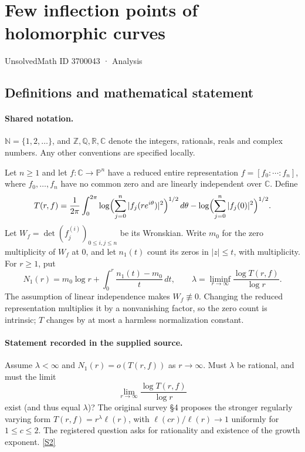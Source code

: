 \documentclass[11pt]{article}
\newcommand{\sref}[2]{\hyperlink{source:#1:#2}{[S#2]}}
\begin{document}
\setcounter{section}{3700042}
\section{Few inflection points of holomorphic curves}\label{3700043}
{\small\sffamily UnsolvedMath ID 3700043 · Analysis}
\subsection{Definitions and mathematical statement}

\paragraph{Shared notation.}$\mathbb N=\{1,2,\ldots\}$, and $\mathbb Z,\mathbb Q,\mathbb R,\mathbb C$ denote the integers, rationals, reals and complex numbers. Any other conventions are specified locally.


Let $n\ge1$ and let $f:\mathbb C\to\mathbb P^n$ have a reduced entire representation $f=[f_0:\cdots:f_n]$, where $f_0,\ldots,f_n$ have no common zero and are linearly independent over $\mathbb C$. Define
\[
 T(r,f)=\frac{1}{2\pi}\int_0^{2\pi}\log\Bigl(\sum_{j=0}^{n}|f_j(re^{i\theta})|^2\Bigr)^{1/2}\,d\theta
 -\log\Bigl(\sum_{j=0}^{n}|f_j(0)|^2\Bigr)^{1/2}.
\]
Let $W_f=\det(f_j^{(i)})_{0\le i,j\le n}$ be its Wronskian. Write $m_0$ for the zero multiplicity of $W_f$ at $0$, and let $n_1(t)$ count its zeros in $|z|\le t$, with multiplicity. For $r\ge1$, put
\[
 N_1(r)=m_0\log r+\int_0^r\frac{n_1(t)-m_0}{t}\,dt,
 \qquad\lambda=\liminf_{r\to\infty}\frac{\log T(r,f)}{\log r}.
\]
The assumption of linear independence makes $W_f\not\equiv0$. Changing the reduced representation multiplies it by a nonvanishing factor, so the zero count is intrinsic; $T$ changes by at most a harmless normalization constant.
\paragraph{Statement recorded in the supplied source.}
Assume $\lambda<\infty$ and $N_1(r)=o(T(r,f))$ as $r\to\infty$. Must $\lambda$ be rational, and must the limit
\[
 \lim_{r\to\infty}\frac{\log T(r,f)}{\log r}
\]
exist (and thus equal $\lambda$)? The original survey §4 proposes the stronger regularly varying form $T(r,f)=r^\lambda\ell(r)$, with $\ell(cr)/\ell(r)\to1$ uniformly for $1\le c\le2$. The registered question asks for rationality and existence of the growth exponent. \sref{3700043}{2}
\end{document}
